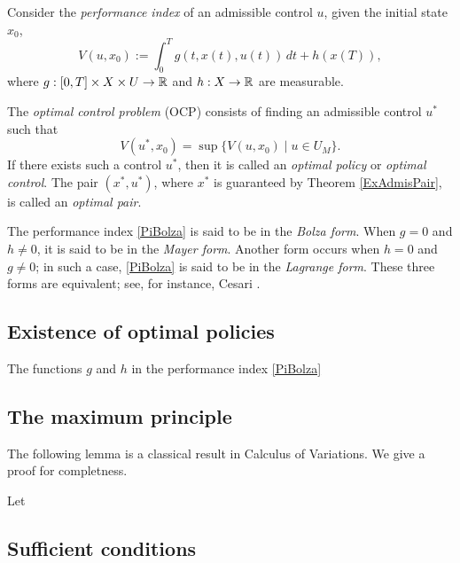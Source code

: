 Consider the {\it performance index} of an admissible control $u$, given the initial state $x_0$, 
        \begin{equation}\label{PiBolza} V(u,x_0) := \int_0^Tg(t,x(t),u(t))\,dt + h(x(T)),\end{equation}
where $g:[0,T]\times X\times U\to \mathbb{R}$ and $h:X\to\mathbb{R}$ are measurable.

The {\it optimal control problem} (OCP) consists of finding an admissible control $u^\ast$ such that
\[ V(u^\ast,x_0)=\sup\{ V(u,x_0)\mid u\in U_M \}.\]
If there exists such a control $u^\ast$, then it is called an {\it optimal policy} or {\it optimal control}. The pair $(x^\ast,u^\ast)$, where $x^\ast$ is guaranteed by Theorem \ref{ExAdmisPair}, is called an {\it optimal pair}.



\begin{remark}\rm
The performance index \eqref{PiBolza} is said to be in the {\it Bolza form}. When $g= 0$ and $h\neq 0$, it is said to be in the {\it Mayer form}. Another form occurs when $h= 0$ and $g\neq 0$; in such a case, \eqref{PiBolza} is said to be in the {\it Lagrange form}. These three forms are equivalent; see, for instance, Cesari \cite[Sect. 1.9]{Cesari83}. 
\end{remark} 


\subsection{Existence of optimal policies}




\begin{assumption}
The functions $g$ and $h$ in the performance index \eqref{PiBolza}
 
\end{assumption}










\subsection{The maximum principle}


The following lemma is a classical result in Calculus of Variations. We give a proof for completness.

\begin{lemma}\label{VariatLemma} Let  

\end{lemma}




\subsection{Sufficient conditions}






